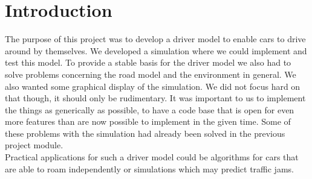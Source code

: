 
\section{Introduction}

The purpose of this project was to develop a driver model
to enable cars to drive around by themselves. We developed
a simulation where we could implement and test this model.
To provide a stable basis for the driver model we also had
to solve problems concerning the road model and the environment
in general. We also wanted some graphical display of the simulation.
We did not focus hard on that though, it should only be 
rudimentary. It was important to us to implement the things
as generically as possible, to have a code base that is open for
even more features than are now possible to implement in the
given time. Some of these problems with the simulation had 
already been solved in the previous project module. \\

Practical applications for such a driver model could be algorithms for 
cars that are able to roam independently or
simulations which may predict traffic jams.

